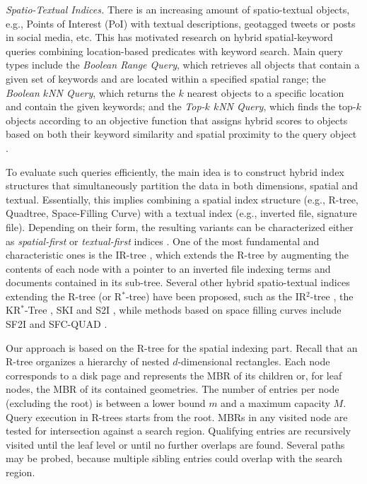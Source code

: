 {{\noindent \emph{Spatio-Textual Indices.} There is an increasing amount of spatio-textual objects, e.g., Points of Interest (PoI) with textual descriptions, geotagged tweets or posts in social media, etc. This has motivated research on hybrid spatial-keyword queries combining location-based predicates with keyword search. Main query types include the \emph{Boolean Range Query}, which retrieves all objects that contain a given set of keywords and are located within a specified spatial range; the \emph{Boolean $k$NN Query}, which returns the $k$ nearest objects to a specific location and contain the given keywords; and the \emph{Top-$k$ $k$NN Query}, which finds the top-$k$ objects according to an objective function that assigns hybrid scores to objects based on both their keyword similarity and spatial proximity to the query object \cite{chen2013pvldb}.

To evaluate such queries efficiently, the main idea is to construct hybrid index structures that simultaneously partition the data in both dimensions, spatial and textual. Essentially, this implies combining a spatial index structure (e.g., R-tree, Quadtree, Space-Filling Curve) with a textual index (e.g., inverted file, signature file). Depending on their form, the resulting variants can be characterized either as {\em spatial-first} or {\em textual-first} indices \cite{christoforaki2011cikm}. One of the most fundamental and characteristic ones is the IR-tree \cite{cong2009vldb,zhisheng2011tkde}, which extends the R-tree by augmenting the contents of each node with a pointer to an inverted file indexing terms and documents contained in its sub-tree. Several other hybrid spatio-textual indices extending the R-tree (or R$^*$-tree) have been proposed, such as the IR$^2$-tree \cite{defelipe2008icde}, the KR$^*$-Tree \cite{hariharan2007ssdbm}, SKI \cite{cary2010ssdbm} and S2I \cite{rocha2011ssd}, while methods based on space filling curves include SF2I \cite{chen2006sigmod} and SFC-QUAD \cite{christoforaki2011cikm}.

Our approach is based on the R-tree \cite{Guttman1984} for the spatial indexing part. Recall that an R-tree organizes a hierarchy of nested $d$-dimensional rectangles. Each node corresponds to a disk page and represents the MBR of its children or, for leaf nodes, the MBR of its contained geometries. The number of entries per node (excluding the root) is between a lower bound $m$ and a maximum capacity $M$. Query execution in R-trees starts from the root. MBRs in any visited node are tested for intersection against a search region. Qualifying entries are recursively visited until the leaf level or until no further overlaps are found. Several paths may be probed, because multiple sibling entries could overlap with the search region.


}}

